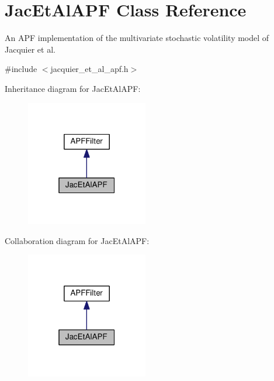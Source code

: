 \hypertarget{classJacEtAlAPF}{}\section{Jac\+Et\+Al\+A\+PF Class Reference}
\label{classJacEtAlAPF}


An A\+PF implementation of the multivariate stochastic volatility model of Jacquier et al.  




{\ttfamily \#include $<$jacquier\+\_\+et\+\_\+al\+\_\+apf.\+h$>$}



Inheritance diagram for Jac\+Et\+Al\+A\+PF\+:\nopagebreak
\begin{figure}[H]
\begin{center}
\leavevmode
\includegraphics[width=151pt]{classJacEtAlAPF__inherit__graph}
\end{center}
\end{figure}


Collaboration diagram for Jac\+Et\+Al\+A\+PF\+:\nopagebreak
\begin{figure}[H]
\begin{center}
\leavevmode
\includegraphics[width=151pt]{classJacEtAlAPF__coll__graph}
\end{center}
\end{figure}
